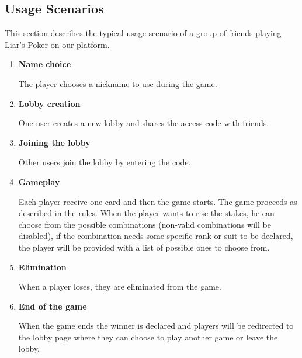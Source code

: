 \documentclass{scrartcl}
\begin{document}
\subsection{Usage Scenarios}\label{usage-scenarios}
This section describes the typical usage scenario of a group of friends playing Liar's Poker on our
platform.
\begin{enumerate}
      \item \textbf{Name choice}\par
            The player chooses a nickname to use during the game.
      \item \textbf{Lobby creation}\par
            One user creates a new lobby and shares the access code with friends.
      \item \textbf{Joining the lobby}\par
            Other users join the lobby by entering the code.
      \item \textbf{Gameplay}\par
            Each player receive one card and then the game starts. The game proceeds as described in
            the rules. When the player wants to rise the stakes, he can choose from the possible
            combinations (non-valid combinations will be disabled), if the combination needs some
            specific rank or suit to be declared, the player will be provided with a list of possible
            ones to choose from.
      \item \textbf{Elimination}\par
            When a player loses, they are eliminated from the game.
      \item \textbf{End of the game}\par
            When the game ends the winner is declared and players will be redirected to the lobby page
            where they can choose to play another game or leave the lobby.
\end{enumerate}
\end{document}
